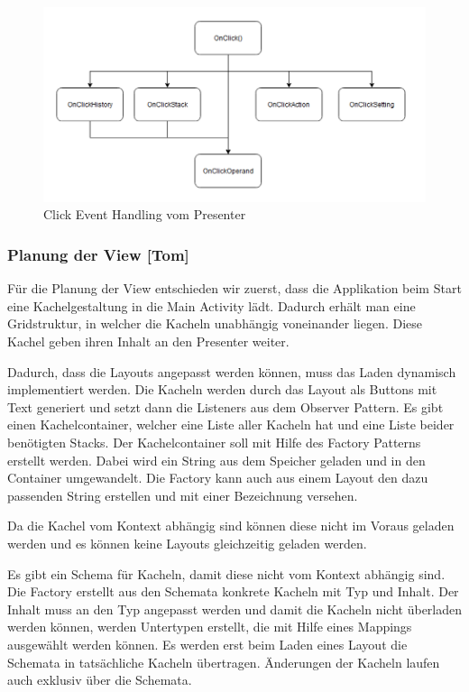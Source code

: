 \begin{figure}[!h]
	\includegraphics[width=1\columnwidth]{img/click-event-handling-vom-presenter}
	\caption[Click Event Handling vom Presenter]{Click Event Handling vom Presenter\footnotemark}
\end{figure}


\clearpage

\subsubsection{Planung der View [Tom]}

Für die Planung der View entschieden wir zuerst, dass die Applikation beim Start eine Kachelgestaltung in die Main Activity lädt. Dadurch erhält man eine Gridstruktur, in welcher die Kacheln unabhängig voneinander liegen. Diese Kachel geben ihren Inhalt an den Presenter weiter.

Dadurch, dass die Layouts angepasst werden können, muss das Laden dynamisch implementiert werden. Die Kacheln werden durch das Layout als Buttons mit Text generiert und setzt dann die Listeners aus dem Observer Pattern. Es gibt einen Kachelcontainer, welcher eine Liste aller Kacheln hat und eine Liste beider benötigten Stacks. Der Kachelcontainer soll mit Hilfe des Factory Patterns erstellt werden. Dabei wird ein String aus dem Speicher geladen und in den Container umgewandelt. Die Factory kann auch aus einem Layout den dazu passenden String erstellen und mit einer Bezeichnung versehen. 

Da die Kachel vom Kontext abhängig sind können diese nicht im Voraus geladen werden und es können keine Layouts gleichzeitig geladen werden. 

Es gibt ein Schema für Kacheln, damit diese nicht vom Kontext abhängig sind. Die Factory erstellt aus den Schemata konkrete Kacheln mit Typ und Inhalt. Der Inhalt muss an den Typ angepasst werden und damit die Kacheln nicht überladen werden können, werden Untertypen erstellt, die mit Hilfe eines Mappings ausgewählt werden können. Es werden erst beim Laden eines Layout die Schemata in tatsächliche Kacheln übertragen. Änderungen der Kacheln laufen auch exklusiv über die Schemata.

